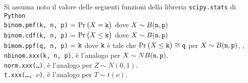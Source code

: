 \documentclass[11pt,twoside,a4paper]{article}
\begin{document}
Si assuma noto il valore delle seguenti funzioni della libreria {\tt scipy.stats\/} di  {\tt Python\/}\\
{\tt binom.pmf(k, n, p)} = $\Pr\big(X={\tt k}\big)$ dove $X\sim B({\tt n},{\tt p})$\\
{\tt binom.cdf(k, n, p)} = $\Pr\big(X\le{\tt k}\big)$ dove  $X\sim B({\tt n},{\tt p})$ \\
{\tt bimom.ppf(q, n, p)} = ${\tt k}$ dove ${\tt k}$ è tale che $\Pr\big(X\le{\tt k}\big)\cong{\tt q}$ per $X\sim B({\tt n},{\tt p})$, ,  {\tt nbinom.xxx(k, n, p)}, è l'analogo per $X\sim NB({\tt n},{\tt p})$.\\
{\tt norm.xxx(\ldots)}, è l'analogo per $Z\sim N(0,1)$.\\
\hfill{\tt t.xxx(\ldots, $\nu$)}, è l'analogo per $T\sim t(\nu)$.
\end{document}
